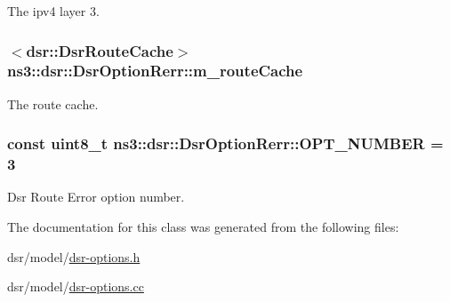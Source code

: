 The ipv4 layer 3. 

\subsubsection[{\texorpdfstring{m\+\_\+route\+Cache}{m_routeCache}}]{$<${\bf dsr\+::\+Dsr\+Route\+Cache}$>$ ns3\+::dsr\+::\+Dsr\+Option\+Rerr\+::m\+\_\+route\+Cache\hspace{0.3cm}{\ttfamily [private]}}\hypertarget{classns3_1_1dsr_1_1DsrOptionRerr_a2838243fd731529ca285ca65c02bcf58}{}\label{classns3_1_1dsr_1_1DsrOptionRerr_a2838243fd731529ca285ca65c02bcf58}


The route cache. 

\subsubsection[{\texorpdfstring{O\+P\+T\+\_\+\+N\+U\+M\+B\+ER}{OPT_NUMBER}}]{\setlength{\rightskip}{0pt plus 5cm}const uint8\+\_\+t ns3\+::dsr\+::\+Dsr\+Option\+Rerr\+::\+O\+P\+T\+\_\+\+N\+U\+M\+B\+ER = 3\hspace{0.3cm}{\ttfamily [static]}}\hypertarget{classns3_1_1dsr_1_1DsrOptionRerr_a50ef8ca32520f468cc263e0703c076c0}{}\label{classns3_1_1dsr_1_1DsrOptionRerr_a50ef8ca32520f468cc263e0703c076c0}


Dsr Route Error option number. 



The documentation for this class was generated from the following files\+:\begin{DoxyCompactItemize}
\item 
dsr/model/\hyperlink{dsr-options_8h}{dsr-\/options.\+h}\item 
dsr/model/\hyperlink{dsr-options_8cc}{dsr-\/options.\+cc}\end{DoxyCompactItemize}
